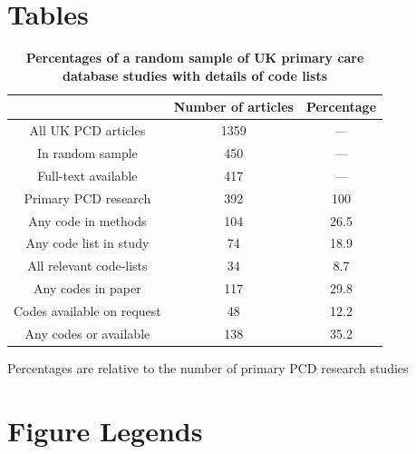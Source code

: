 \documentclass[10pt]{article}
\begin{document}


\section*{Tables}

\begin{table}[!ht]
  \caption{
    \bf{Percentages of a random sample of UK primary care database studies with details of code lists}}
  \begin{tabular}{|c|c|c|}
    \hline
                 & Number of articles & Percentage \\
    \hline
    All UK PCD articles        & 1359 & ---  \\
    In random sample           & 450  & ---  \\
    Full-text available        & 417  & ---  \\
    Primary PCD research       & 392  & 100  \\
    Any code in methods        & 104  & 26.5 \\
    Any code list in study     & 74   & 18.9 \\
    All relevant code-lists    & 34   & 8.7  \\
    Any codes in paper         & 117  & 29.8 \\
    Codes available on request & 48   & 12.2 \\
    Any codes or available     & 138  & 35.2 \\
    \hline
  \end{tabular}
  \begin{flushleft}Percentages are relative to the number of primary PCD research studies 
  \end{flushleft}
  \label{tab:table1_percentages}
\end{table}


\section*{Figure Legends}
\end{document}
